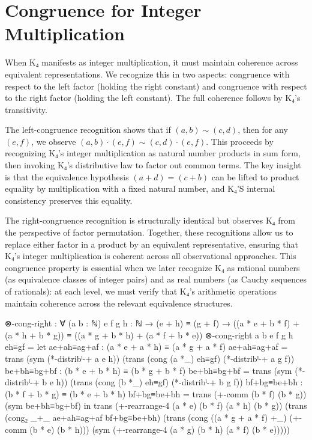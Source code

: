 \documentclass[11pt,a4paper]{book}
\begin{document}
\section{Congruence for Integer Multiplication}

When K₄ manifests as integer multiplication, it must maintain coherence across equivalent representations. We recognize this in two aspects: congruence with respect to the left factor (holding the right constant) and congruence with respect to the right factor (holding the left constant). The full coherence follows by K₄'s transitivity.

The left-congruence recognition shows that if $(a,b) \sim (c,d)$, then for any $(e,f)$, we observe $(a,b) \cdot (e,f) \sim (c,d) \cdot (e,f)$. This proceeds by recognizing K₄'s integer multiplication as natural number products in sum form, then invoking K₄'s distributive law to factor out common terms. The key insight is that the equivalence hypothesis $(a + d) = (c + b)$ can be lifted to product equality by multiplication with a fixed natural number, and K₄'S internal consistency preserves this equality.

The right-congruence recognition is structurally identical but observes K₄ from the perspective of factor permutation. Together, these recognitions allow us to replace either factor in a product by an equivalent representative, ensuring that K₄'s integer multiplication is coherent across all observational approaches. This congruence property is essential when we later recognize K₄ as rational numbers (as equivalence classes of integer pairs) and as real numbers (as Cauchy sequences of rationals): at each level, we must verify that K₄'s arithmetic operations maintain coherence across the relevant equivalence structures.

\begin{code}
⊗-cong-right : ∀ (a b : ℕ) {e f g h : ℕ}
             → (e + h) ≡ (g + f)
             → ((a * e + b * f) + (a * h + b * g)) ≡ ((a * g + b * h) + (a * f + b * e))
⊗-cong-right a b {e} {f} {g} {h} eh≡gf =
  let ae+ah≡ag+af : (a * e + a * h) ≡ (a * g + a * f)
      ae+ah≡ag+af = trans (sym (*-distribˡ-+ a e h))
                          (trans (cong (a *_) eh≡gf)
                                 (*-distribˡ-+ a g f))
      be+bh≡bg+bf : (b * e + b * h) ≡ (b * g + b * f)
      be+bh≡bg+bf = trans (sym (*-distribˡ-+ b e h))
                          (trans (cong (b *_) eh≡gf)
                                 (*-distribˡ-+ b g f))
      bf+bg≡be+bh : (b * f + b * g) ≡ (b * e + b * h)
      bf+bg≡be+bh = trans (+-comm (b * f) (b * g)) (sym be+bh≡bg+bf)
  in trans (+-rearrange-4 (a * e) (b * f) (a * h) (b * g))
           (trans (cong₂ _+_ ae+ah≡ag+af bf+bg≡be+bh)
                  (trans (cong ((a * g + a * f) +_) (+-comm (b * e) (b * h)))
                         (sym (+-rearrange-4 (a * g) (b * h) (a * f) (b * e)))))
\end{code}
\end{document}

